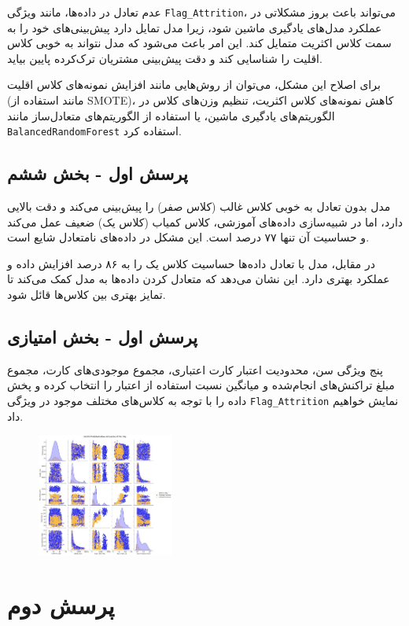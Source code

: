 \documentclass{article}
\begin{document}
عدم تعادل در داده‌ها، مانند ویژگی \texttt{Flag\_Attrition}، می‌تواند باعث بروز مشکلاتی در عملکرد مدل‌های یادگیری ماشین شود، زیرا مدل تمایل دارد پیش‌بینی‌های خود را به سمت کلاس اکثریت متمایل کند. این امر باعث می‌شود که مدل نتواند به خوبی کلاس اقلیت را شناسایی کند و دقت پیش‌بینی مشتریان ترک‌کرده پایین بیاید.

برای اصلاح این مشکل، می‌توان از روش‌هایی مانند افزایش نمونه‌های کلاس اقلیت (مانند استفاده از SMOTE)، کاهش نمونه‌های کلاس اکثریت، تنظیم وزن‌های کلاس در الگوریتم‌های یادگیری ماشین، یا استفاده از الگوریتم‌های متعادل‌ساز مانند \texttt{BalancedRandomForest} استفاده کرد.

\subsection{پرسش اول - بخش ششم}
مدل بدون تعادل به خوبی کلاس غالب (کلاس صفر) را پیش‌بینی می‌کند و دقت بالایی دارد، اما در شبیه‌سازی داده‌های آموزشی، کلاس کمیاب (کلاس یک) ضعیف عمل می‌کند و حساسیت آن تنها ۷۷ درصد است. این مشکل در داده‌های نامتعادل شایع است.

در مقابل، مدل با تعادل داده‌ها حساسیت کلاس یک را به ۸۶ درصد افزایش داده و عملکرد بهتری دارد. این نشان می‌دهد که متعادل کردن داده‌ها به مدل کمک می‌کند تا تمایز بهتری بین کلاس‌ها قائل شود.

\subsection{پرسش اول - بخش امتیازی}
پنج ویژگی سن، محدودیت اعتبار کارت اعتباری، مجموع موجودی‌های کارت، مجموع مبلغ تراکنش‌های انجام‌شده و میانگین نسبت استفاده از اعتبار را انتخاب کرده و پخش داده را با توجه به کلاس‌های مختلف موجود در ویژگی \texttt{Flag\_Attrition} نمایش خواهیم داد.

\begin{figure}[!h]
    \centering
    \includegraphics[width=0.4\textwidth]{img/4.png}
\end{figure}

\section{پرسش دوم}
\end{document}
